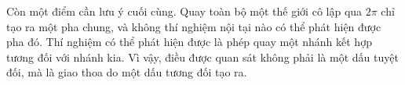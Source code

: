 \begin{classroomqa}
\end{classroomqa}

Còn một điểm cần lưu ý cuối cùng. Quay toàn bộ một thế giới cô lập qua \(2\pi\) chỉ tạo ra một pha chung, và không thí nghiệm nội tại nào có thể phát hiện được pha đó. Thí nghiệm có thể phát hiện được là phép quay một nhánh kết hợp tương đối với nhánh kia. Vì vậy, điều được quan sát không phải là một dấu tuyệt đối, mà là giao thoa do một dấu tương đối tạo ra.
